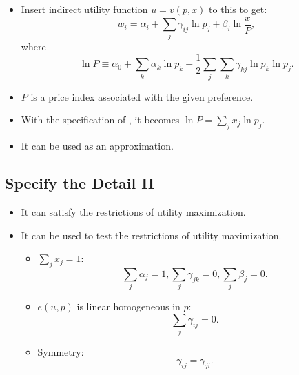 \documentclass[
]{book}
\providecommand{\tightlist}{%
  \setlength{\itemsep}{0pt}\setlength{\parskip}{0pt}}
\begin{document}
\begin{itemize}
\tightlist
\item
  Insert indirect utility function \(u = v(p, x)\) to this to get:
  \begin{equation}
  w_i = \alpha_i + \sum_{j} \gamma_{ij} \ln p_j + \beta_i \ln \frac{x}{P},
  \end{equation}
  where
  \begin{equation}
  \ln P \equiv  \alpha_0 + \sum_{k} \alpha_k \ln p_k + \frac{1}{2} \sum_{j} \sum_{k} \gamma_{kj} \ln p_k \ln p_j.
  \end{equation}
\item
  \(P\) is a price index associated with the given preference.
\item
  With the specification of \citet{RichardStone1954}, it becomes \(\ln P = \sum_{j} x_j \ln p_j\).
\item
  It can be used as an approximation.
\end{itemize}

\hypertarget{specify-the-detail-ii}{%
\subsection{Specify the Detail II}\label{specify-the-detail-ii}}

\begin{itemize}
\tightlist
\item
  It can satisfy the restrictions of utility maximization.
\item
  It can be used to test the restrictions of utility maximization.

  \begin{itemize}
  \tightlist
  \item
    \(\sum_{j} x_j = 1\):
    \begin{equation}
    \sum_{j} \alpha_j = 1, \sum_{j} \gamma_{jk} = 0, \sum_{j} \beta_j = 0.
    \end{equation}
  \item
    \(e(u, p)\) is linear homogeneous in \(p\):
    \begin{equation}
    \sum_{j} \gamma_{ij} = 0.
    \end{equation}
  \item
    Symmetry:
    \begin{equation}
    \gamma_{ij} = \gamma_{ji}.
    \end{equation}
  \end{itemize}
\end{itemize}
\end{document}
